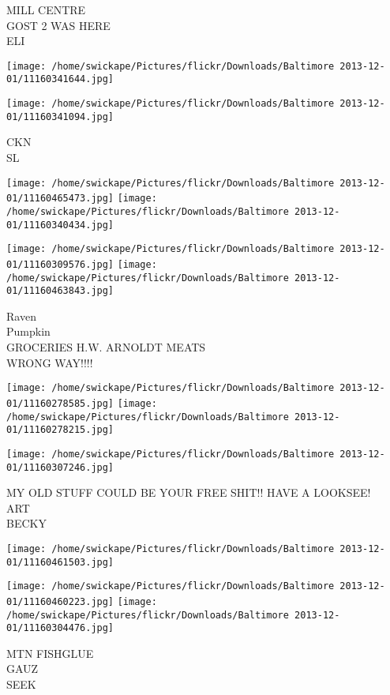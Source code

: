 \documentclass[10pt,letterpaper]{article}
\begin{document}
MILL CENTRE\\
GOST 2 WAS HERE\\
ELI
\pagebreak

\texttt{[image: /home/swickape/Pictures/flickr/Downloads/Baltimore 2013-12-01/11160341644.jpg]}

\vspace{0.25in}
\texttt{[image: /home/swickape/Pictures/flickr/Downloads/Baltimore 2013-12-01/11160341094.jpg]}

CKN\\
SL
\pagebreak

\texttt{[image: /home/swickape/Pictures/flickr/Downloads/Baltimore 2013-12-01/11160465473.jpg]}
\texttt{[image: /home/swickape/Pictures/flickr/Downloads/Baltimore 2013-12-01/11160340434.jpg]}

\texttt{[image: /home/swickape/Pictures/flickr/Downloads/Baltimore 2013-12-01/11160309576.jpg]}
\texttt{[image: /home/swickape/Pictures/flickr/Downloads/Baltimore 2013-12-01/11160463843.jpg]}

Raven\\
Pumpkin\\
GROCERIES H.W. ARNOLDT MEATS\\
WRONG WAY!!!!
\pagebreak

\texttt{[image: /home/swickape/Pictures/flickr/Downloads/Baltimore 2013-12-01/11160278585.jpg]}
\texttt{[image: /home/swickape/Pictures/flickr/Downloads/Baltimore 2013-12-01/11160278215.jpg]}

\vspace{0.25in}
\texttt{[image: /home/swickape/Pictures/flickr/Downloads/Baltimore 2013-12-01/11160307246.jpg]}

MY OLD STUFF COULD BE YOUR FREE SHIT!! HAVE A LOOKSEE!\\
ART\\
BECKY
\pagebreak

\texttt{[image: /home/swickape/Pictures/flickr/Downloads/Baltimore 2013-12-01/11160461503.jpg]}

\vspace{0.25in}
\texttt{[image: /home/swickape/Pictures/flickr/Downloads/Baltimore 2013-12-01/11160460223.jpg]}
\texttt{[image: /home/swickape/Pictures/flickr/Downloads/Baltimore 2013-12-01/11160304476.jpg]}

MTN FISHGLUE\\
GAUZ\\
SEEK
\pagebreak
\end{document}
